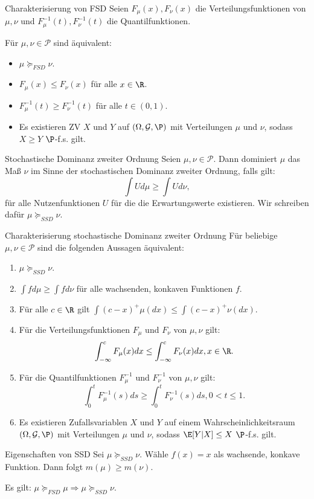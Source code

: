 \begin{karte}{Charakterisierung von FSD}
Seien \(F_\mu(x), F_\nu(x)\) die Verteilungsfunktionen von \(\mu, \nu\) 
und \(F_\mu^{-1}(t), F_\nu^{-1}(t)\) die Quantilfunktionen. 

Für \(\mu, \nu \in \mathcal{P}\) sind äquivalent: 
\begin{itemize}
    \item \(\mu \succeq_{FSD} \nu\).
    \item \(F_\mu(x) \leq F_\nu(x)\) für alle \(x\in \R\).
    \item \(F_{\mu}^{-1}(t) \geq F_\nu^{-1}(t)\) für alle \(t\in (0,1)\).
    \item Es existieren ZV \(X\) und \(Y\) auf \((\Omega, \mathcal{G}, \P)\) 
    mit Verteilungen \(\mu\) und \(\nu\), sodass \(X\geq Y \) \(\P\)-f.s. gilt.
\end{itemize}
\end{karte}

\begin{karte}{Stochastische Dominanz zweiter Ordnung}
Seien \(\mu,\nu \in \mathcal{P}\). Dann dominiert \(\mu\) das Maß \(\nu\) 
im Sinne der stochastischen Dominanz zweiter Ordnung, falls gilt: 
\[ \int U d\mu \geq \int U d\nu, \]
für alle Nutzenfunktionen \(U\) für die die Erwartungswerte existieren. 
Wir schreiben dafür \(\mu \succeq_{SSD} \nu\). 
\end{karte}

\begin{karte}{Charakterisierung stochastische Dominanz zweiter Ordnung}
Für beliebige \(\mu, \nu\in \mathcal{P}\) sind die folgenden Aussagen äquivalent: 
\begin{enumerate}
    \item \(\mu \succeq_{SSD}\nu\).
    \item \(\int f d\mu \geq \int f d\nu\) für alle wachsenden, konkaven Funktionen \(f\).
    \item Für alle \(c\in\R\) gilt \(\int (c-x)^+ \mu(dx) \leq \int (c-x)^+ \nu(dx)\).
    \item Für die Verteilungsfunktionen \(F_\mu\) und \(F_\nu\) von \(\mu, \nu\) gilt: 
    \[ \int_{-\infty}^c F_\mu(x) dx \leq \int_{-\infty}^c F_\nu(x) dx, x\in \R. \]
    \item Für die Quantilfunktionen \(F_\mu^{-1}\) und \(F_\nu^{-1}\) von \(\mu, \nu\) gilt: 
    \[ \int_0^t F_\mu^{-1}(s) ds \geq \int_0^t F_\nu^{-1}(s) ds, 0<t\leq 1. \]
    \item Es existieren Zufallsvariablen \(X\) und \(Y\) auf einem Wahrscheinlichkeitsraum \((\Omega, \mathcal{G}, \P)\)
    mit Verteilungen \(\mu\) und \(\nu\), sodass \(\E[Y|X] \leq X\) \(\P\)-f.s. gilt.
\end{enumerate}
\end{karte}

\begin{karte}{Eigenschaften von SSD}
Sei \(\mu \succeq_{SSD}\nu\). Wähle \(f(x) = x\) als wachsende, konkave Funktion. Dann folgt \(m(\mu) \geq m(\nu)\).

Es gilt: \(\mu \succeq_{FSD} \mu \Rightarrow \mu \succeq_{SSD} \nu\).
\end{karte}